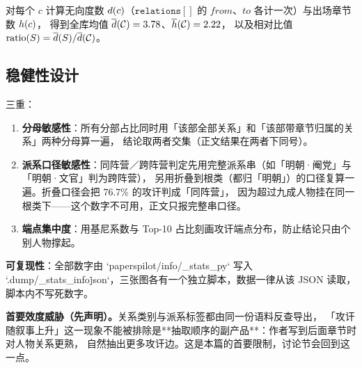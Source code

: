 对每个 $c$ 计算无向度数 $d(c)$（$\texttt{relations}[]$ 的 $from$、$to$ 各计一次）与出场章节数 $h(c)$，
得到全库均值 $\overline{d}(\mathcal{C})=3.78$、$\overline{h}(\mathcal{C})=2.22$，
以及相对比值 $\mathrm{ratio}(S)=\overline{d}(S)/\overline{d}(\mathcal{C})$。

\subsection{稳健性设计}

三重：
\begin{enumerate}
  \item \textbf{分母敏感性}：所有分部占比同时用「该部全部关系」和「该部带章节归属的关系」两种分母算一遍，
        结论取两者交集（正文结果在两者下同号）。
  \item \textbf{派系口径敏感性}：同阵营／跨阵营判定先用完整派系串（如「明朝·阉党」与「明朝·文官」判为跨阵营），
        另用折叠到根类（都归「明朝」）的口径复算一遍。折叠口径会把 76.7\% 的攻讦判成「同阵营」，
        因为超过九成人物挂在同一根类下——这个数字不可用，正文只报完整串口径。
  \item \textbf{端点集中度}：用基尼系数与 Top-10 占比刻画攻讦端点分布，防止结论只由个别人物撑起。
\end{enumerate}

\textbf{可复现性}：全部数字由 `papers\textunderscore{}pilot/info/\_stats\_py` 写入
`.dump/\_stats\_info\.json`，三张图各有一个独立脚本，数据一律从该 JSON 读取，脚本内不写死数字。

\textbf{首要效度威胁（先声明）。}关系类别与派系标签都由同一份语料反查导出，
「攻讦随叙事上升」这一现象不能被排除是**抽取顺序的副产品**：作者写到后面章节时对人物关系更熟，
自然抽出更多攻讦边。这是本篇的首要限制，讨论节会回到这一点。
